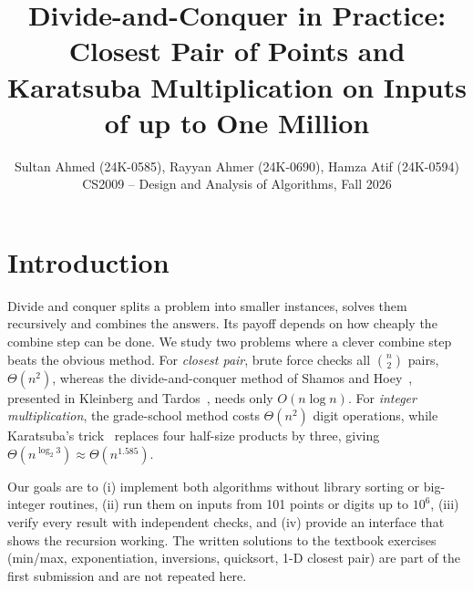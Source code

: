\documentclass[10pt,twocolumn]{article}
\title{\vspace{-8mm}\large\bfseries Divide-and-Conquer in Practice: Closest Pair of Points and\\Karatsuba Multiplication on Inputs of up to One Million\vspace{-2mm}}
\author{\small Sultan Ahmed (24K-0585), Rayyan Ahmer (24K-0690), Hamza Atif (24K-0594)\\[-1pt]
\footnotesize CS2009 -- Design and Analysis of Algorithms, Fall 2026}
\date{}
\begin{document}

\section{Introduction}
Divide and conquer splits a problem into smaller instances, solves them recursively and combines the answers. Its payoff depends on how cheaply the combine step can be done. We study two problems where a clever combine step beats the obvious method. For \emph{closest pair}, brute force checks all $\binom{n}{2}$ pairs, $\Theta(n^2)$, whereas the divide-and-conquer method of Shamos and Hoey~\cite{shamos1975}, presented in Kleinberg and Tardos~\cite{kleinberg2006}, needs only $O(n\log n)$. For \emph{integer multiplication}, the grade-school method costs $\Theta(n^2)$ digit operations, while Karatsuba's trick~\cite{karatsuba1962} replaces four half-size products by three, giving $\Theta(n^{\log_2 3})\approx\Theta(n^{1.585})$.

Our goals are to (i) implement both algorithms without library sorting or big-integer routines, (ii) run them on inputs from 101 points or digits up to $10^6$, (iii) verify every result with independent checks, and (iv) provide an interface that shows the recursion working. The written solutions to the textbook exercises~\cite{levitin2012,kleinberg2006} (min/max, exponentiation, inversions, quicksort, 1-D closest pair) are part of the first submission and are not repeated here.
\end{document}

